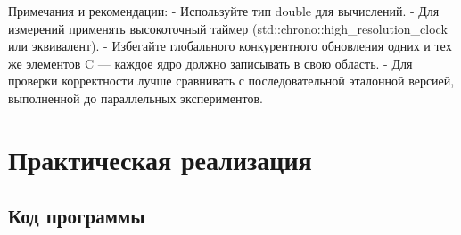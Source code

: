 \documentclass[a4paper, 14pt]{extarticle}
\begin{document}
Примечания и рекомендации:
- Используйте тип double для вычислений.
- Для измерений применять высокоточный таймер (std::chrono::high\_resolution\_clock или эквивалент).
- Избегайте глобального конкурентного обновления одних и тех же элементов C — каждое ядро должно записывать в свою область.
- Для проверки корректности лучше сравнивать с последовательной эталонной версией, выполненной до параллельных экспериментов.

\section*{Практическая реализация}\label{Sect::implementation}

\subsection*{Код программы}\label{Subsect::source_code}
\end{document}
